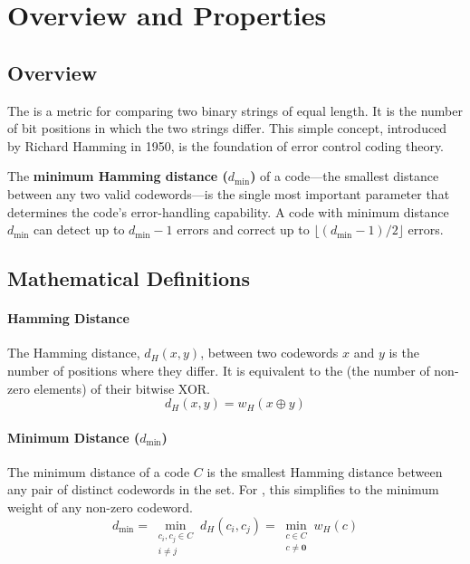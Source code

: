 \section{Overview and Properties}

\subsection{Overview}

The  is a metric for comparing two binary strings of equal length. It is the number of bit positions in which the two strings differ. This simple concept, introduced by Richard Hamming in 1950, is the foundation of error control coding theory.

\begin{keyconcept}
    The \textbf{minimum Hamming distance ($d_{\min}$)} of a code---the smallest distance between any two valid codewords---is the single most important parameter that determines the code's error-handling capability. A code with minimum distance $d_{\min}$ can detect up to $d_{\min}-1$ errors and correct up to $\lfloor(d_{\min}-1)/2\rfloor$ errors.
\end{keyconcept}


\subsection{Mathematical Definitions}

\paragraph{Hamming Distance}
The Hamming distance, $d_H(x, y)$, between two codewords $x$ and $y$ is the number of positions where they differ. It is equivalent to the  (the number of non-zero elements) of their bitwise XOR.
\begin{equation}
    d_H(x, y) = w_H(x \oplus y)
\end{equation}

\paragraph{Minimum Distance ($d_{\min}$)}
The minimum distance of a code $C$ is the smallest Hamming distance between any pair of distinct codewords in the set. For , this simplifies to the minimum weight of any non-zero codeword.
\begin{equation}
    d_{\min} = \min_{\substack{c_i, c_j \in C \\ i \neq j}} d_H(c_i, c_j) = \min_{\substack{c \in C \\ c \neq \mathbf{0}}} w_H(c)
\end{equation}

